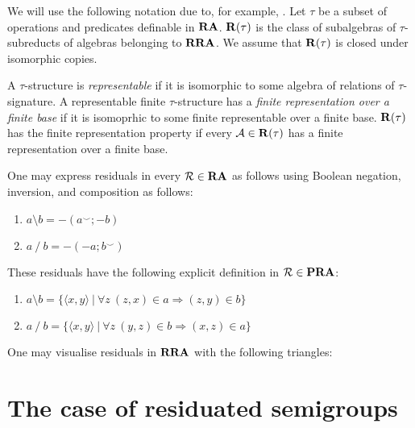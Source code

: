 \documentclass[a4paper]{article}
\theoremstyle{definition}
\theoremstyle{theorem}
\theoremstyle{proposition}
\theoremstyle{lemma}
\theoremstyle{ex}
\theoremstyle{corollary}
\theoremstyle{claim}
\begin{document}
We will use the following notation due to, for example, \cite{hirsch2011positive}. Let $\tau$ be a subset of operations and predicates definable in ${\bf RA}$. ${\bf R}(\tau)$ is the class of subalgebras of $\tau$-subreducts of algebras belonging to ${\bf RRA}$. We assume that ${\bf R}(\tau)$ is closed under isomorphic copies.

A $\tau$-structure is \emph{representable} if it is isomorphic to some algebra of relations of $\tau$-signature. A representable finite $\tau$-structure has a \emph{finite representation over a finite base} if it is isomoprhic to some finite representable over a finite base. ${\bf R}(\tau)$ has the finite representation property if every $\mathcal{A} \in {\bf R}(\tau)$ has a finite representation over a finite base.

One may express residuals in every $\mathcal{R} \in {\bf RA}$ as follows using Boolean negation, inversion, and composition as follows:

\begin{enumerate}
  \item $a \setminus b = -(a^{\smile} ; -b)$
  \item $a \: / \: b = - (- a ; b^{\smile})$
\end{enumerate}

These residuals have the following explicit definition in $\mathcal{R} \in {\bf PRA}$:
\begin{enumerate}
  \item $a \setminus b = \{ \langle x, y \rangle \: | \: \forall z \: (z, x) \in a \Rightarrow (z, y) \in b \}$
  \item $a \: / \: b = \{ \langle x, y \rangle \: | \: \forall z \: (y, z) \in b \Rightarrow (x, z) \in a \}$
\end{enumerate}

One may visualise residuals in ${\bf RRA}$ with the following triangles:


\section{The case of residuated semigroups}
\end{document}
